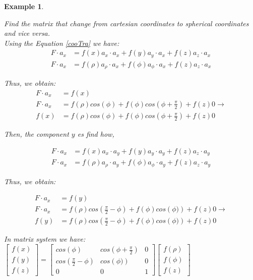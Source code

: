 \documentclass[12pt,letterpaper]{book}
\newtheorem{example}{Example}[section]
\begin{document}
\begin{example}
\begin{multicols}{2}

Find the matrix that change from cartesian coordinates to spherical coordinates and vice versa.\\
 Using the Equation \eqref{cooTra} we have:
\begin{align*}
F\cdot a_x&=f(x)a_x \cdot a_x +f(y)a_y\cdot a_x +f(z)a_z \cdot a_x\\
F\cdot a_x&=f({\rho })a_{\rho } \cdot a_x+f({\phi })a_{\phi }\cdot a_x+f(z)a_z \cdot a_x
\end{align*}


Thus, we obtain:
\begin{align*}
F\cdot a_x&=f(x)\\
F\cdot a_x&=f({\rho })cos(\phi )+f({\phi })cos\left(\phi +\frac{\pi }{2}\right)+f(z)0 \rightarrow\\
f(x)&=f({\rho })cos(\phi )+f({\phi })cos\left(\phi +\frac{\pi }{2}\right)+f(z)0
\end{align*}



Then, the component $y$ es find how,


\begin{align*}
F\cdot a_x&=f(x)a_x \cdot a_y +f(y)a_y\cdot a_y +f(z)a_z \cdot a_y\\
F\cdot a_x&=f({\rho })a_{\rho } \cdot a_y+f({\phi })a_{\phi }\cdot a_y+f(z)a_z \cdot a_y
\end{align*}


Thus, we obtain:


\begin{align*}
F\cdot a_x&=f(y)\\
F\cdot a_x&=f({\rho })cos\left(\frac{\pi }{2}-\phi \right)+f({\phi })cos\left(\phi )\right)+f(z)0 \rightarrow\\
f(y)&=f({\rho })cos\left(\frac{\pi }{2}-\phi \right)+f({\phi })cos\left(\phi )\right)+f(z)0 
\end{align*}


In matrix system we have:\\

$
\left[\begin{array}{c}
f(x)\\
f(y)\\
f(z)
\end{array}\right]
=
\left[\begin{array}{ccc}
cos(\phi )	&	cos\left(\phi +\frac{\pi }{2}\right)	&	0\\
cos\left(\frac{\pi }{2}-\phi \right)	&	cos\left(\phi )\right)	&	0\\
0 & 0 & 1
\end{array}\right]
\left[\begin{array}{c}
f(\rho )\\
f(\phi )\\
f(z)
\end{array}\right]
$\\


\end{multicols}
\end{example}
\end{document}
